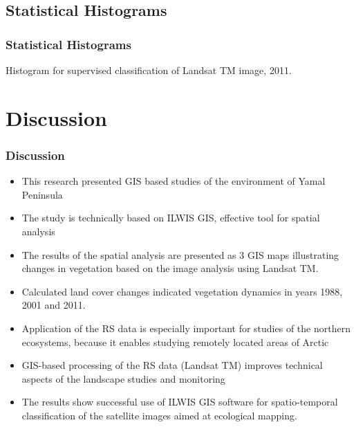 \documentclass[pdflatex,compress,8pt,
	xcolor={dvipsnames,dvipsnames,svgnames,x11names,table},
	hyperref={colorlinks = true,breaklinks = true, urlcolor = NavyBlue, breaklinks = true}]{beamer}
\begin{document}
\subsection{Statistical Histograms}
\begin{frame}\frametitle{Statistical Histograms}
Histogram for supervised classification of Landsat TM image, 2011.
\begin{figure}[H]
	\centering
			\vspace{2mm}
\end{figure}
\end{frame}

\section{Discussion}
\begin{frame}\frametitle{Discussion}
\begin{itemize}
        \item This research presented GIS based studies of the environment of Yamal Peninsula
        \item The study is technically based on ILWIS GIS, effective tool for spatial analysis
        \item The results of the spatial analysis are presented as 3 GIS maps illustrating changes in vegetation based on the image analysis using Landsat TM.
        \item Calculated land cover changes indicated vegetation dynamics in years 1988, 2001 and 2011.
        \item Application of the RS data is especially important for studies of the northern ecosystems, because it enables studying remotely located areas of Arctic
	\item GIS-based processing of the RS data (Landsat TM) improves technical aspects of the landscape studies and monitoring
	\item The results show successful use of ILWIS GIS software for spatio-temporal classification of the satellite images aimed at ecological mapping.
	\end{itemize}
\end{frame}
\end{document}

